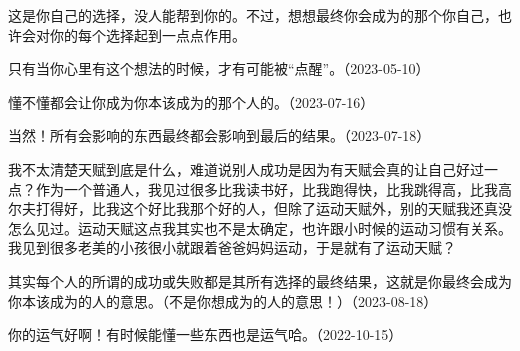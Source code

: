 这是你自己的选择，没人能帮到你的。不过，想想最终你会成为的那个你自己，也许会对你的每个选择起到一点点作用。


只有当你心里有这个想法的时候，才有可能被“点醒”。（2023-05-10）



懂不懂都会让你成为你本该成为的那个人的。（2023-07-16）


当然！所有会影响的东西最终都会影响到最后的结果。（2023-07-18）

我不太清楚天赋到底是什么，难道说别人成功是因为有天赋会真的让自己好过一点？作为一个普通人，我见过很多比我读书好，比我跑得快，比我跳得高，比我高尔夫打得好，比我这个好比我那个好的人，但除了运动天赋外，别的天赋我还真没怎么见过。运动天赋这点我其实也不是太确定，也许跟小时候的运动习惯有关系。我见到很多老美的小孩很小就跟着爸爸妈妈运动，于是就有了运动天赋？


其实每个人的所谓的成功或失败都是其所有选择的最终结果，这就是你最终会成为你本该成为的人的意思。（不是你想成为的人的意思！）（2023-08-18）


你的运气好啊！有时候能懂一些东西也是运气哈。（2022-10-15）
